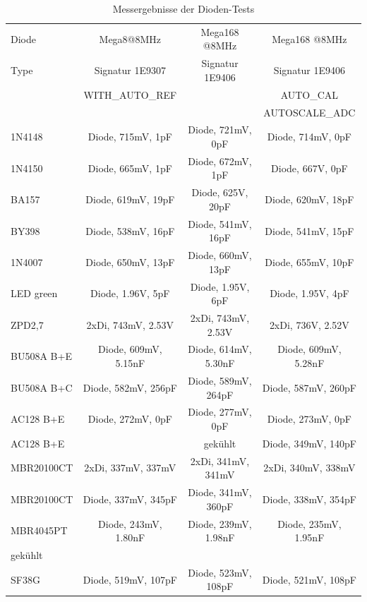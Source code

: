 \begin{table}[H]
  \begin{center}
    \begin{tabular}{| l | c | c | c |}
    \hline
     Diode & Mega8@8MHz          & Mega168 @8MHz       & Mega168 @8MHz     \\
     Type  & Signatur 1E9307     & Signatur 1E9406     & Signatur 1E9406   \\
           & WITH\_AUTO\_REF     &                     & AUTO\_CAL         \\
           &                     &                     & AUTOSCALE\_ADC    \\
    \hline
    \hline
1N4148     & Diode, 715mV, 1pF    & Diode, 721mV, 0pF   & Diode, 714mV, 0pF  \\
    \hline
1N4150     & Diode, 665mV, 1pF    & Diode, 672mV, 1pF   & Diode, 667V, 0pF  \\
    \hline
BA157      & Diode, 619mV, 19pF   & Diode, 625V, 20pF   & Diode, 620mV, 18pF \\
    \hline
BY398      & Diode, 538mV, 16pF   & Diode, 541mV, 16pF  & Diode, 541mV, 15pF \\
    \hline
1N4007     & Diode, 650mV, 13pF   & Diode, 660mV, 13pF  & Diode, 655mV, 10pF \\
    \hline
LED green  & Diode, 1.96V, 5pF    & Diode, 1.95V, 6pF   & Diode, 1.95V, 4pF \\
    \hline
ZPD2,7     & 2xDi, 743mV, 2.53V   & 2xDi, 743mV, 2.53V  & 2xDi, 736V, 2.52V \\
    \hline
BU508A B+E & Diode, 609mV, 5.15nF & Diode, 614mV, 5.30nF & Diode, 609mV, 5.28nF\\
    \hline
BU508A B+C & Diode, 582mV, 256pF  & Diode, 589mV, 264pF & Diode, 587mV, 260pF\\
    \hline
AC128 B+E  & Diode, 272mV, 0pF    & Diode, 277mV, 0pF   & Diode, 273mV, 0pF  \\
    \hline
AC128 B+E  &                      &    gekühlt          & Diode, 349mV, 140pF  \\
    \hline
MBR20100CT & 2xDi, 337mV, 337mV   & 2xDi, 341mV, 341mV  & 2xDi, 340mV, 338mV  \\
    \hline
MBR20100CT & Diode, 337mV, 345pF  & Diode, 341mV, 360pF & Diode, 338mV, 354pF\\
    \hline
MBR4045PT  & Diode, 243mV, 1.80nF & Diode, 239mV, 1.98nF & Diode, 235mV, 1.95nF\\
gekühlt    &                      &                     &                   \\
    \hline
SF38G      & Diode, 519mV, 107pF  & Diode, 523mV, 108pF & Diode, 521mV, 108pF\\
    \hline
    \end{tabular}
  \end{center}
  \caption{Messergebnisse der Dioden-Tests}
  \label{tab:diodes} 
\end{table}

